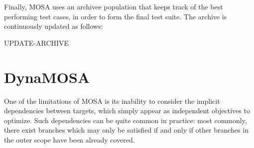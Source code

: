 \newpage
Finally, MOSA uses an archivee population that keeps track of the best performing test cases, in order to form the final test suite. The archive is continuously updated as follows:

\begin{algorithm}[H]
    \caption{UPDATE-ARCHIVE}


    \DontPrintSemicolon   

\end{algorithm}




\newpage
\section{DynaMOSA}
One of the limitations of MOSA is its inability to consider the implicit dependencies between targets, which simply appear as independent objectives to optimize. Such dependencies can be quite common in practice: most commonly, there exist branches which may only be satisfied if and only if other branches in the outer scope have been already covered. 


